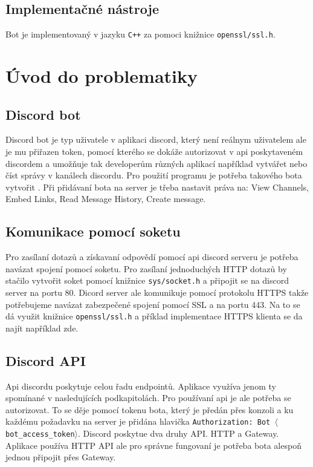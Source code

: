 \documentclass[a4paper,11pt]{article}
\begin{document}
\subsection{Implementačné nástroje}
Bot je implementovaný v jazyku \texttt{C++} za pomoci knižnice \texttt{openssl/ssl.h}.

\section{Úvod do problematiky}

\subsection{Discord bot}
Discord bot je typ uživatele v aplikaci discord, který není reálnym uživatelem ale je mu přiřazen token,
pomocí kterého se dokáže autorizovat v api poskytaveném discordem a umožňuje tak developerům různých aplikací například vytvářet nebo číst správy v kanálech discordu.
Pro použití programu je potřeba takového bota vytvořit \cite{dbot}. Při přidávaní bota na server je třeba nastavit práva na: View Channels, Embed Links, Read Message History, Create message.

\subsection{Komunikace pomocí soketu}
Pro zasílaní dotazů a získavaní odpovědí pomocí api discord serveru je potřeba navázat spojení pomocí soketu. Pro zasílaní jednoduchých HTTP dotazů by stačilo vytvořit soket pomocí knižnice \texttt{sys/socket.h}\cite{socketc} a připojit se na discord server na portu 80. Dicord server ale komunikuje pomocí protokolu HTTPS takže potřebujeme navázat
zabezpečené spojení pomocí SSL a na portu 443. Na to se dá využit knižnice \texttt{openssl/ssl.h}\cite{ssldocs} a příklad implementace HTTPS klienta se da najít například zde\cite{ssli}.

\subsection{Discord API}
Api discordu poskytuje celou řadu endpointů. Aplikace využíva jenom ty spomínané v nasledujících podkapitolách.
Pro používaní api je ale potřeba se autorizovat. To se děje pomocí tokenu bota, který je předán přes konzoli a ku každému požadavku na server je přidána hlavička \texttt{Authorization: Bot $\langle$bot\_access\_token$\rangle$}.
Discord poskytue dva druhy API. HTTP a Gateway. Aplikace používa HTTP API ale pro správne fungovaní je potřeba bota alespoň jednou připojit přes Gateway\cite{wsconnect}.
\end{document}
